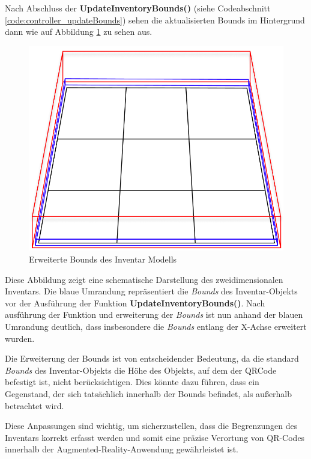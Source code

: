 Nach Abschluss der \textbf{UpdateInventoryBounds()} (siehe Codeabschnitt \ref{code:controller_updateBounds}) sehen die
aktualisierten Bounds im Hintergrund dann wie auf Abbildung \ref{fig:extended_inventoryBounds} zu sehen aus.
\begin{figure}[h]
\centering
\includegraphics[scale=0.4]{images/extendedBounds}
\caption{Erweiterte Bounds des Inventar Modells}
\label{fig:extended_inventoryBounds}
\end{figure}
Diese Abbildung zeigt eine schematische Darstellung des zweidimensionalen Inventars. Die blaue Umrandung repräsentiert
die \textit{Bounds} des Inventar-Objekts vor der Ausführung der Funktion \textbf{UpdateInventoryBounds()}. Nach ausführung
der Funktion und erweiterung der \textit{Bounds} ist nun anhand der blauen Umrandung deutlich, dass insbesondere die
\textit{Bounds} entlang der X-Achse erweitert wurden.

Die Erweiterung der Bounds ist von entscheidender Bedeutung, da die standard \textit{Bounds} des Inventar-Objekts die
Höhe des Objekts, auf dem der QRCode befestigt ist, nicht berücksichtigen. Dies könnte dazu führen, dass ein Gegenstand,
der sich tatsächlich innerhalb der Bounds befindet, als außerhalb betrachtet wird.

Diese Anpassungen sind wichtig, um sicherzustellen, dass die Begrenzungen des Inventars korrekt erfasst werden und somit
eine präzise Verortung von QR-Codes innerhalb der Augmented-Reality-Anwendung gewährleistet ist.

